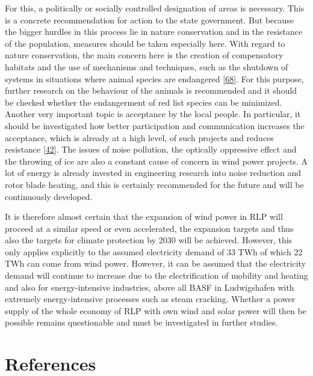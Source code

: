 \documentclass[a4paper,11pt]{article}
\begin{document}
For this, a politically or socially controlled designation of areas is necessary. This is a concrete recommendation for action to the state government. But because the bigger hurdles in this process lie in nature conservation and in the resistance of the population, measures should be taken especially here. With regard to nature conservation, the main concern here is the creation of compensatory habitats and the use of mechanisms and techniques, such as the shutdown of systems in situations where animal species are endangered {[}\protect\hyperlink{ref-BUNDux5cux26Nabu.2017}{68}{]}. For this purpose, further research on the behaviour of the animals is recommended and it should be checked whether the endangerment of red list species can be minimized. Another very important topic is acceptance by the local people. In particular, it should be investigated how better participation and communication increases the acceptance, which is already at a high level, of such projects and reduces resistance {[}\protect\hyperlink{ref-FachagenturWindenergieanLand.2020}{42}{]}. The issues of noise pollution, the optically oppressive effect and the throwing of ice are also a constant cause of concern in wind power projects. A lot of energy is already invested in engineering research into noise reduction and rotor blade heating, and this is certainly recommended for the future and will be continuously developed.

It is therefore almost certain that the expansion of wind power in RLP will proceed at a similar speed or even accelerated, the expansion targets and thus also the targets for climate protection by 2030 will be achieved. However, this only applies explicitly to the assumed electricity demand of 33 TWh of which 22 TWh can come from wind power. However, it can be assumed that the electricity demand will continue to increase due to the electrification of mobility and heating and also for energy-intensive industries, above all BASF in Ludwigshafen with extremely energy-intensive processes such as steam cracking. Whether a power supply of the whole economy of RLP with own wind and solar power will then be possible remains questionable and must be investigated in further studies.

\newpage

\hypertarget{references}{%
\section*{References}\label{references}}
\end{document}
